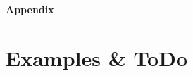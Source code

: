 \appendix	%

\clearforchapter
\begin{vplace}[0.7]
\begin{center}
\Huge \textbf{Appendix}
\end{center}
\end{vplace}








\chapter{Examples \& ToDo}

\clearpage
\listoftodos
